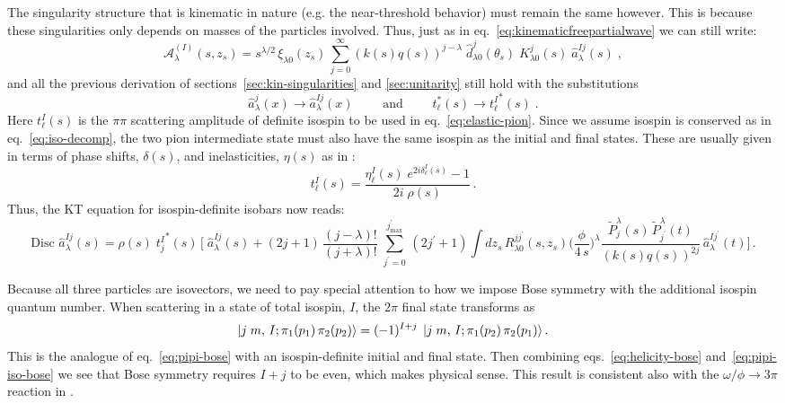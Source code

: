 \documentclass[10pt, aps,prd,amsmath,amssymb,superscriptaddress,onecolumn,
nofootinbib,showpacs,preprintnumbers]{revtex4-1}
\newcommand{\mand}{\qquad \text{ and } \qquad}
\newcommand{\jpmax}{{j^\prime_\text{max}}}
\newcommand{\Disc}{\text{Disc }}
\begin{document}
 The singularity structure that is kinematic in nature (e.g. the near-threshold behavior) must remain the same however. This is because these singularities only depends on masses of the particles involved. Thus, just as in eq.~\ref{eq:kinematicfreepartialwave} we can still write:
    \begin{equation}
      \label{eq:model-iso-helicity}
      \mathcal{A}^{(I)}_\lambda(s,z_s) = s^{\lambda/2} \, \xi_{\lambda0}(z_s) \, \sum_{j=0}^\infty (k(s)q(s))^{j-\lambda} \; \hat{d}^j_{\lambda0}(\theta_s) \;  K^j_{\lambda0}(s) \; \hat{a}^{Ij}_{\lambda}(s)
      \; ,
    \end{equation}
and all the previous derivation of sections~\ref{sec:kin-singularities} and \ref{sec:unitarity} still hold with the substitutions
  \begin{equation}
    \hat{a}^j_\lambda(x) \rightarrow \hat{a}^{Ij}_{\lambda}(x)
    \mand
    t^*_\ell(s) \rightarrow {t^I_{\ell}}^*(s) \; .
  \end{equation}
Here \(t^I_{\ell}(s)\) is the \(\pi\pi\) scattering amplitude of definite isospin to be used in eq.~\ref{eq:elastic-pion}. Since we assume isospin is conserved as in eq.~\ref{eq:iso-decomp}, the two pion intermediate state must also have the same isospin as the initial and final states. These are usually given in terms of phase shifts, \(\delta(s)\), and inelasticities, \(\eta(s)\) as in \cite{Albaladejo2018}:
  \begin{equation}
    t^{I}_{\ell}(s) = \frac{\eta^I_\ell(s) \; e^{2i \delta^I_\ell(s)} -1}{2i \; \rho(s)} \,.
  \end{equation}
Thus, the KT equation for isospin-definite isobars now reads:
  \begin{equation}
    \label{eq:final-kt-isospin}
    \Disc \hat{a}^{Ij}_{\lambda}(s) = \rho(s) \; {t^I_{j}}^*(s) \, \bigg[ \; \hat{a}^{Ij}_{\lambda}(s) +  (2j+1) \, \frac{(j-\lambda)!}{(j+\lambda)!} \;  \sum_{j^\prime = 0}^\jpmax \, (2j^\prime+1)
    \int dz_s \, R^{jj^\prime}_{\lambda0}(s,z_s) \bigg(\frac{\phi}{4 \, s}\bigg)^\lambda \frac{\tilde{P}^\lambda_j(s) \, \tilde{P}_{j^\prime}^\lambda(t)}{(k(s)q(s))^{2j}} \, \hat{a}^{Ij^\prime}_{\lambda}(t) \bigg]
    \,.
  \end{equation}

Because all three particles are isovectors, we need to pay special attention to how we impose Bose symmetry with the additional isospin quantum number. When scattering in a state of total isospin, \(I\), the \(2\pi\) final state transforms as
  \begin{equation}
    \label{eq:pipi-iso-bose}
    \ket{j \; m, \, I; \pi_1(p_1) \, \pi_2(p_2)} = (-1)^{I+j} \; \ket{j \; m, \, I; \pi_1(p_2) \, \pi_2(p_1)}.
  \end{equation}
This is the analogue of eq.~\ref{eq:pipi-bose} with an isospin-definite initial and final state.
Then combining eqs.~\ref{eq:helicity-bose} and~\ref{eq:pipi-iso-bose} we see that Bose symmetry requires \(I + j\) to be even, which makes physical sense. This result is consistent also with the \(\omega/\phi \to 3\pi\) reaction in \cite{Danilkin:2014cra,Niecknig:2012sj}.
\end{document}
